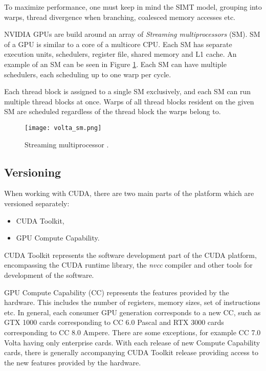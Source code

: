 To maximize performance, one must keep in mind the SIMT model, grouping into warps, thread divergence when branching, coalesced memory accesses etc.

NVIDIA GPUs are build around an array of \textit{Streaming multiprocessors} (SM). SM of a GPU is similar to a core of a multicore CPU. Each SM has separate execution units, schedulers, register file, shared memory and L1 cache. An example of an SM can be seen in Figure \ref{fig:volta_sm}. Each SM can have multiple schedulers, each scheduling up to one warp per cycle. 

Each thread block is assigned to a single SM exclusively, and each SM can run multiple thread blocks at once. Warps of all thread blocks resident on the given SM are scheduled regardless of the thread block the warps belong to.


\begin{figure}[ht]
	\centering
	\texttt{[image: volta\_sm.png]}
	\caption{Streaming multiprocessor \citep{paper:volta}.}
	\label{fig:volta_sm}
\end{figure}

\subsection{Versioning}

When working with CUDA, there are two main parts of the platform which are versioned separately: %
\begin{itemize}
	\item CUDA Toolkit,
	\item GPU Compute Capability.
\end{itemize}

CUDA Toolkit represents the software development part of the CUDA platform, encompassing the CUDA runtime library, the \textit{nvcc} compiler and other tools for development of the software.

GPU Compute Capability (CC) represents the features provided by the hardware. This includes the number of registers, memory sizes, set of instructions etc. In general, each consumer GPU generation corresponds to a new CC, such as GTX 1000 cards corresponding to CC 6.0 Pascal and RTX 3000 cards corresponding to CC 8.0 Ampere. There are some exceptions, for example CC 7.0 Volta having only enterprise cards. With each release of new Compute Capability cards, there is generally accompanying CUDA Toolkit release providing access to the new features provided by the hardware. 

